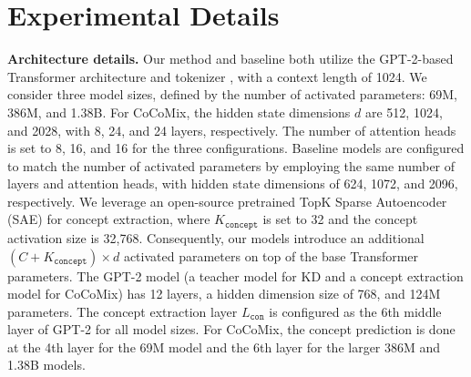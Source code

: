 \documentclass[]{fairmeta}
\newcommand{\sname}{CoCoMix\xspace}
\begin{document}
\clearpage
\newpage



\clearpage
\newpage
\beginappendix

\section{Experimental Details}
\label{appn:exp}

\textbf{Architecture details.} Our method and baseline both utilize the GPT-2-based Transformer architecture and tokenizer \citep{radford2019language}, with a context length of 1024. We consider three model sizes, defined by the number of activated parameters: 69M, 386M, and 1.38B. For \sname, the hidden state dimensions $d$ are 512, 1024, and 2028, with 8, 24, and 24 layers, respectively. The number of attention heads is set to 8, 16, and 16 for the three configurations. Baseline models are configured to match the number of activated parameters by employing the same number of layers and attention heads, with hidden state dimensions of 624, 1072, and 2096, respectively. We leverage an open-source pretrained TopK Sparse Autoencoder (SAE) \citep{gao2024scaling} for concept extraction, where $K_{\mathtt{concept}}$ is set to 32 and the concept activation size is 32,768. Consequently, our models introduce an additional $(C + K_{\mathtt{concept}}) \times d$ activated parameters on top of the base Transformer parameters. The GPT-2 model (a teacher model for KD and a concept extraction model for \sname) has 12 layers, a hidden dimension size of 768, and 124M parameters. The concept extraction layer $L_{\mathtt{con}}$ is configured as the 6th middle layer of GPT-2 for all model sizes. For \sname, the concept prediction is done at the 4th layer for the 69M model and the 6th layer for the larger 386M and 1.38B models.
\end{document}
